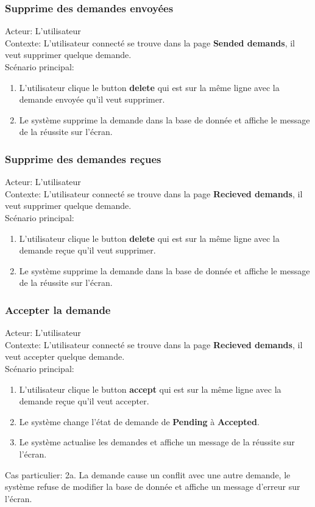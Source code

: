 \documentclass[14px]{article}
\begin{document}
\subsubsection{Supprime des demandes envoyées}
Acteur: L'utilisateur\\
Contexte: L'utilisateur connecté se trouve dans la page \textbf{Sended demands}, il veut supprimer quelque demande.\\
Scénario principal:
\begin{enumerate}
	\item L'utilisateur clique le button \textbf{delete} qui est sur la même ligne avec la demande envoyée qu'il veut supprimer.
	\item Le système supprime la demande dans la base de donnée et affiche le message de la réussite sur l'écran.
\end{enumerate}

\subsubsection{Supprime des demandes reçues}
Acteur: L'utilisateur\\
Contexte: L'utilisateur connecté se trouve dans la page \textbf{Recieved demands}, il veut supprimer quelque demande.\\
Scénario principal:
\begin{enumerate}
	\item L'utilisateur clique le button \textbf{delete} qui est sur la même ligne avec la demande reçue qu'il veut supprimer.
	\item Le système supprime la demande dans la base de donnée et affiche le message de la réussite sur l'écran.
\end{enumerate}

\subsubsection{Accepter la demande}
Acteur: L'utilisateur\\
Contexte: L'utilisateur connecté se trouve dans la page \textbf{Recieved demands}, il veut accepter quelque demande.\\
Scénario principal:
\begin{enumerate}
	\item L'utilisateur clique le button \textbf{accept} qui est sur la même ligne avec la demande reçue qu'il veut accepter.
	\item Le système change l'état de demande de \textbf{Pending} à \textbf{Accepted}.
	\item Le système actualise les demandes et affiche un message de la réussite sur l'écran.
\end{enumerate}
Cas particulier:
2a. La demande cause un conflit avec une autre demande, le système refuse de modifier la base de donnée et affiche un message d'erreur sur l'écran.
\end{document}
